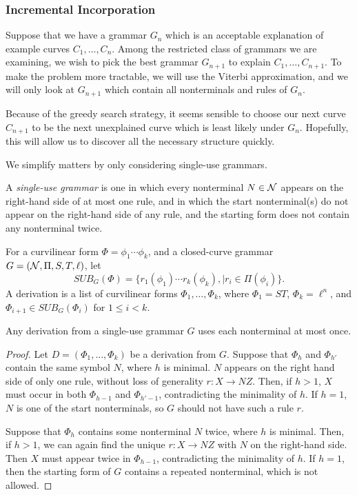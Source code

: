 \documentclass{article}
\begin{document}
\subsubsection{Incremental Incorporation}

Suppose that we have a grammar $G_n$ which is an acceptable
explanation of example curves $C_1,\dots, C_n$.  Among the restricted
class of grammars we are examining, we wish to pick the best grammar
$G_{n+1}$ to explain $C_1,\dots, C_{n+1}$. To make the problem more
tractable, we will use the Viterbi approximation, and we will only
look at $G_{n+1}$ which contain all nonterminals and rules of $G_n$.

Because of the greedy search strategy, it seems sensible
to choose our next curve $C_{n+1}$ to be the next unexplained
curve which is least likely under $G_n$. Hopefully, this will
allow us to discover all the necessary structure quickly.

We simplify matters by only considering single-use grammars.
\begin{defn}
A {\em single-use grammar} is one in which every nonterminal $N\in
{\mathcal N}$ appears on the right-hand side of at most one rule, and in which
the start nonterminal(s) do not appear on the right-hand side of any rule,
and the starting form does not contain any nonterminal twice.
\end{defn}

\begin{defn}
For a curvilinear form $\Phi = \phi_1 \cdots \phi_k$, and a
closed-curve grammar $G = ({\mathcal N},\Pi,S,T,\ell)$, let $$SUB_G(\Phi) = \{
r_1(\phi_1) \cdots r_k (\phi_k),\mid r_i \in \Pi(\phi_i) \}.$$ A derivation is
a list of curvilinear forms $\Phi_1,\dots, \Phi_k$, where $\Phi_1 =
ST$, $\Phi_k = \ell^n$, and $\Phi_{i+1} \in SUB_G(\Phi_i)$ for $1\le i
< k$.
\end{defn}

\begin{lem}
Any derivation from a single-use grammar $G$ uses each nonterminal at
most once. 
\end{lem}
\begin{proof}
Let $D = (\Phi_1, \dots, \Phi_k)$ be a derivation from $G$.  Suppose
that $\Phi_h$ and $\Phi_{h'}$ contain the same symbol $N$, where $h$
is minimal. $N$ appears on the right hand side of only one rule,
without loss of generality $r : X \to N Z$. Then, if $h>1$, $X$ must
occur in both $\Phi_{h-1}$ and $\Phi_{h'-1}$, contradicting the
minimality of $h$. If $h=1$, $N$ is one of the start nonterminals, so
$G$ should not have such a rule $r$.

Suppose that $\Phi_h$ contains some nonterminal $N$ twice, where $h$
is minimal. Then, if $h>1$, we can again find the unique $r : X \to N
Z$ with $N$ on the right-hand side. Then $X$ must appear twice in
$\Phi_{h-1}$, contradicting the minimality of $h$. If $h=1$, then the
starting form of $G$ contains a repeated nonterminal, which is not
allowed.
\end{proof}
\end{document}
